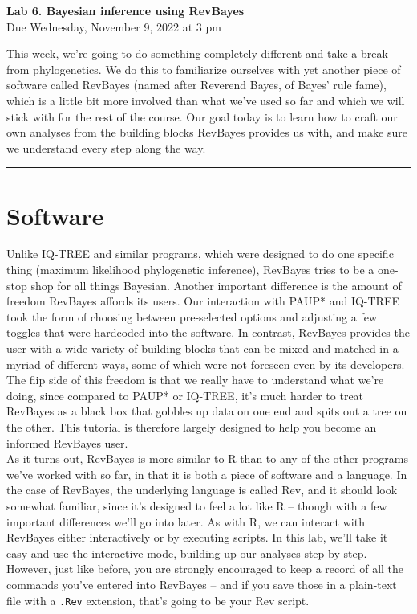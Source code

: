 \documentclass[12pt]{article}
\begin{document}
\frenchspacing

\begin{center}
{\Large \textbf{Lab 6. Bayesian inference using RevBayes}} \\[0.5cm]
{\large Due Wednesday, November 9, 2022 at 3 pm}
\end{center}

\vspace{1cm}

\noindent This week, we're going to do something completely different and take a break from phylogenetics. We do this to familiarize ourselves with yet another piece of software called RevBayes (named after Reverend Bayes, of Bayes' rule fame), which is a little bit more involved than what we've used so far and which we will stick with for the rest of the course. Our goal today is to learn how to craft our own analyses from the building blocks RevBayes provides us with, and make sure we understand every step along the way. \\

\hrule

\section*{Software}

Unlike IQ-TREE and similar programs, which were designed to do one specific thing (maximum likelihood phylogenetic inference), RevBayes tries to be a one-stop shop for all things Bayesian. Another important difference is the amount of freedom RevBayes affords its users. Our interaction with PAUP* and IQ-TREE took the form of choosing between pre-selected options and adjusting a few toggles that were hardcoded into the software. In contrast, RevBayes provides the user with a wide variety of building blocks that can be mixed and matched in a myriad of different ways, some of which were not foreseen even by its developers. The flip side of this freedom is that we really have to understand what we're doing, since compared to PAUP* or IQ-TREE, it's much harder to treat RevBayes as a black box that gobbles up data on one end and spits out a tree on the other. This tutorial is therefore largely designed to help you become an informed RevBayes user. \\

\noindent As it turns out, RevBayes is more similar to \textsf{R} than to any of the other programs we've worked with so far, in that it is both a piece of software and a language. In the case of RevBayes, the underlying language is called Rev, and it should look somewhat familiar, since it's designed to feel a lot like \textsf{R} -- though with a few important differences we'll go into later. As with \textsf{R}, we can interact with RevBayes either interactively or by executing scripts. In this lab, we'll take it easy and use the interactive mode, building up our analyses step by step. However, just like before, you are strongly encouraged to keep a record of all the commands you've entered into RevBayes -- and if you save those in a plain-text file with a \texttt{.Rev} extension, that's going to be your Rev script. \\
\end{document}
